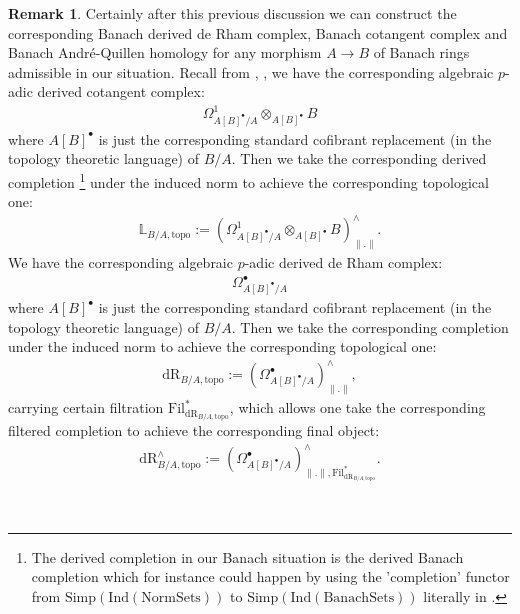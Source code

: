 \documentclass[12pt]{amsart}
\theoremstyle{definition}
\newtheorem{remark}[theorem]{Remark}
\numberwithin{equation}{section}
\begin{document}
\begin{remark}
Certainly after this previous discussion we can construct the corresponding Banach derived de Rham complex, Banach cotangent complex and Banach Andr\'e-Quillen homology for any morphism $A\rightarrow B$ of Banach rings admissible in our situation. Recall from \cite{III1}, \cite{III2}, \cite{B1} we have the corresponding algebraic $p$-adic derived cotangent complex:
\begin{align}
\Omega^1_{A[B]^\bullet/A}\otimes_{A[B]^\bullet}B
\end{align}
where $A[B]^\bullet$ is just the corresponding standard cofibrant replacement (in the topology theoretic language) of $B/A$. Then we take the corresponding derived completion \footnote{The derived completion in our Banach situation is the derived Banach completion which for instance could happen by using the 'completion' functor from $\mathrm{Simp}(\mathrm{Ind}(\mathrm{NormSets}))$ to $\mathrm{Simp}(\mathrm{Ind}(\mathrm{BanachSets}))$ literally in \cite{BBBK}.} under the induced norm to achieve the corresponding topological one:
\begin{align}
\mathbb{L}_{B/A,\mathrm{topo}}:=(\Omega^1_{A[B]^\bullet/A}\otimes_{A[B]^\bullet}B)^\wedge_{\|.\|}.
\end{align}
We have the corresponding algebraic $p$-adic derived de Rham complex:
\begin{align}
\Omega^\bullet_{A[B]^\bullet/A}
\end{align}
where $A[B]^\bullet$ is just the corresponding standard cofibrant replacement (in the topology theoretic language) of $B/A$. Then we take the corresponding completion under the induced norm to achieve the corresponding topological one:
\begin{align}
\mathbb{\mathrm{dR}}_{B/A,\mathrm{topo}}:=(\Omega^\bullet_{A[B]^\bullet/A})^\wedge_{\|.\|},
\end{align}
carrying certain filtration $\mathrm{Fil}^*_{\mathbb{\mathrm{dR}}_{B/A,\mathrm{topo}}}$, which allows one take the corresponding filtered completion to achieve the corresponding final object:
\begin{align}
\mathbb{\mathrm{dR}}^\wedge_{B/A,\mathrm{topo}}:=(\Omega^\bullet_{A[B]^\bullet/A})^\wedge_{\|.\|,\mathrm{Fil}^*_{\mathbb{\mathrm{dR}}_{B/A,\mathrm{topo}}}}.
\end{align}
\end{remark}






\
\end{document}
